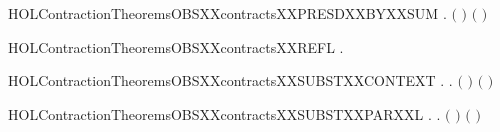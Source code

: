 \newcommand{\HOLContractionTheoremsOBSXXcontractsXXPRESDXXBYXXPAR}{\UseVerbatim{HOLContractionTheoremsOBSXXcontractsXXPRESDXXBYXXPAR}}
\begin{SaveVerbatim}{HOLContractionTheoremsOBSXXcontractsXXPRESDXXBYXXSUM}
\HOLTokenTurnstile{} \HOLSymConst{\HOLTokenForall{}}   .
          \HOLSymConst{\HOLTokenConj{}}    \HOLSymConst{\HOLTokenImp{}}
        \ensuremath{(} \HOLSymConst{\ensuremath{+}} \ensuremath{)} \ensuremath{(} \HOLSymConst{\ensuremath{+}} \ensuremath{)}
\end{SaveVerbatim}
\newcommand{\HOLContractionTheoremsOBSXXcontractsXXPRESDXXBYXXSUM}{\UseVerbatim{HOLContractionTheoremsOBSXXcontractsXXPRESDXXBYXXSUM}}
\begin{SaveVerbatim}{HOLContractionTheoremsOBSXXcontractsXXREFL}
\HOLTokenTurnstile{} \HOLSymConst{\HOLTokenForall{}}.   
\end{SaveVerbatim}
\newcommand{\HOLContractionTheoremsOBSXXcontractsXXREFL}{\UseVerbatim{HOLContractionTheoremsOBSXXcontractsXXREFL}}
\begin{SaveVerbatim}{HOLContractionTheoremsOBSXXcontractsXXSUBSTXXCONTEXT}
\HOLTokenTurnstile{} \HOLSymConst{\HOLTokenForall{}} .
          \HOLSymConst{\HOLTokenImp{}}
       \HOLSymConst{\HOLTokenForall{}}.   \HOLSymConst{\HOLTokenImp{}}  \ensuremath{(} \ensuremath{)} \ensuremath{(} \ensuremath{)}
\end{SaveVerbatim}
\newcommand{\HOLContractionTheoremsOBSXXcontractsXXSUBSTXXCONTEXT}{\UseVerbatim{HOLContractionTheoremsOBSXXcontractsXXSUBSTXXCONTEXT}}
\begin{SaveVerbatim}{HOLContractionTheoremsOBSXXcontractsXXSUBSTXXPARXXL}
\HOLTokenTurnstile{} \HOLSymConst{\HOLTokenForall{}} .
          \HOLSymConst{\HOLTokenImp{}}
       \HOLSymConst{\HOLTokenForall{}}.  \ensuremath{(} \HOLSymConst{\ensuremath{\mid}} \ensuremath{)} \ensuremath{(} \HOLSymConst{\ensuremath{\mid}} \ensuremath{)}
\end{SaveVerbatim}
